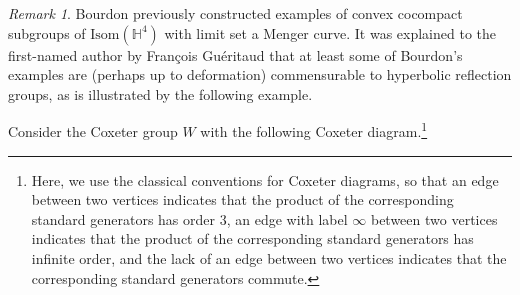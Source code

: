 \documentclass{amsart}
\theoremstyle{plain}
\theoremstyle{definition}
\theoremstyle{remark}
\newtheorem{remark}[theorem]{Remark}
\numberwithin{equation}{section}
\newcommand{\hh}{\mathbb H}
\begin{document}
\begin{remark}\label{remark:bourdon}
Bourdon \cite{BO97} previously constructed examples of convex cocompact subgroups of $\mathrm{Isom} (\hh^4)$ with limit set a Menger curve. It was explained to the first-named author by Fran\c{c}ois Gu\'eritaud that at least some of Bourdon's examples are (perhaps up to deformation) commensurable to hyperbolic reflection groups, as is illustrated by the following example.

Consider the Coxeter group $W$ with the following Coxeter diagram.\footnote{Here, we use the classical conventions for Coxeter diagrams, so that an edge between two vertices indicates that the product of the corresponding standard generators has order $3$, an edge with label $\infty$ between two vertices indicates that the product of the corresponding standard generators has infinite order, and the lack of an edge between two vertices indicates that the corresponding standard generators commute.}

\begin{figure}[ht!]
\end{figure}


\end{remark}
\end{document}
